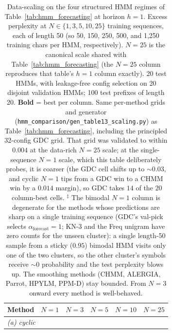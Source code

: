 \begin{table}[t]
\centering
\caption{Data-scaling on the four structured HMM regimes of Table~\ref{tab:hmm_forecasting} at horizon $h{=}1$. Excess perplexity at $N \in \{1, 3, 5, 10, 25\}$ training sequences, each of length 50 (so 50, 150, 250, 500, and 1{,}250 training chars per HMM, respectively). $N{=}25$ is the canonical scale shared with Table~\ref{tab:hmm_forecasting} (the $N{=}25$ column reproduces that table's $h{=}1$ column exactly). 20 test HMMs, with leakage-free config selection on 20 disjoint validation HMMs; 100 test prefixes of length 20. \textbf{Bold} = best per column. Same per-method grids and generator (\texttt{hmm\_comparison/gen\_table13\_scaling.py}) as Table~\ref{tab:hmm_forecasting}, including the principled 32-config GDC grid. That grid was validated to within $0.004$ at the data-rich $N{=}25$ scale; at the single-sequence $N{=}1$ scale, which this table deliberately probes, it is coarser (the GDC cell shifts up to $\sim0.03$, and cyclic $N{=}1$ tips from a GDC win to a CHMM win by a $0.014$ margin), so GDC takes $14$ of the $20$ column-best cells. $^\ddagger$ The bimodal $N{=}1$ column is degenerate for the methods whose predictions are sharp on a single training sequence (GDC's val-pick selects $\alpha_{\mathrm{forecast}}{=}1$; KN-3 and the Freq unigram have zero counts for the unseen cluster): a single length-50 sample from a sticky ($0.95$) bimodal HMM visits only one of the two clusters, so the other cluster's symbols receive $\sim\!0$ probability and the test perplexity blows up. The smoothing methods (CHMM, ALERGIA, Parrot, HPYLM, PPM-D) stay bounded. From $N{=}3$ onward every method is well-behaved.}
\label{tab:hmm_scaling}
\small
\begin{tabular}{l r r r r r}
\toprule
Method & $N{=}1$ & $N{=}3$ & $N{=}5$ & $N{=}10$ & $N{=}25$ \\
\midrule
\multicolumn{6}{l}{\emph{(a) cyclic}} \\

\end{tabular}
\end{table}
